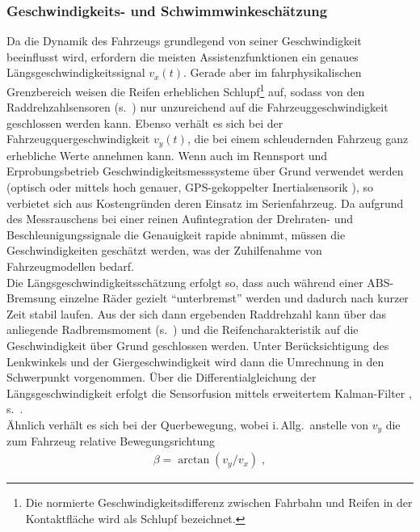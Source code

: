 \subsubsection{Geschwindigkeits- und Schwimmwinkeschätzung} \label{sec:beta_v} %
Da die Dynamik des Fahrzeugs grundlegend von seiner Geschwindigkeit beeinflusst wird, erfordern die meisten Assistenzfunktionen ein genaues Längsgeschwindigkeitssignal $v_x(t)$. Gerade aber im fahrphysikalischen Grenzbereich weisen die Reifen erheblichen Schlupf\footnote{Die normierte Geschwindigkeitsdifferenz zwischen Fahrbahn und Reifen in der Kontaktfläche wird als Schlupf bezeichnet.} auf, sodass von den Raddrehzahlsensoren (s.\ \cite{reif2010sensoren}) nur unzureichend auf die Fahrzeuggeschwindigkeit geschlossen werden kann. Ebenso verhält es sich bei der Fahrzeugquergeschwindigkeit $v_y(t)$, die bei einem schleudernden Fahrzeug ganz erhebliche Werte annehmen kann. Wenn auch im Rennsport und Erprobungsbetrieb Geschwindigkeitsmesssysteme über Grund verwendet werden (optisch \cite{horn2006zweidimensionale} oder mittels hoch genauer, GPS-gekoppelter Inertialsensorik \cite{ryu2004integrating}), so verbietet sich aus Kostengründen deren Einsatz im Serienfahrzeug. Da aufgrund des Messrauschens bei einer reinen Aufintegration der Drehraten- und Beschleunigungssignale die Genauigkeit rapide abnimmt, müssen die Geschwindigkeiten geschätzt werden, was der Zuhilfenahme von Fahrzeugmodellen bedarf. \\
Die Längsgeschwindigkeitsschätzung erfolgt so, dass auch während einer ABS-Bremsung einzelne Räder gezielt "`unterbremst"' werden und dadurch nach kurzer Zeit stabil laufen. Aus der sich dann ergebenden Raddrehzahl kann über das anliegende Radbremsmoment (s.\ ) und die Reifencharakteristik auf die Geschwindigkeit über Grund geschlossen werden. Unter Berücksichtigung des Lenkwinkels und der Giergeschwindigkeit wird dann die Umrechnung in den Schwerpunkt vorgenommen. Über die Differentialgleichung der Längsgeschwindigkeit erfolgt die Sensorfusion mittels erweitertem Kalman-Filter \cite{kalman1960new}, s.\, \cite{BHB2012_vanZanten_bremsanlage}. \\
Ähnlich verhält es sich bei der Querbewegung, wobei i.\,Allg.\ anstelle von $v_y$ die zum Fahrzeug relative Bewegungsrichtung
\begin{align*}
	\beta = \arctan(v_y/v_x)\;,
\end{align*}

